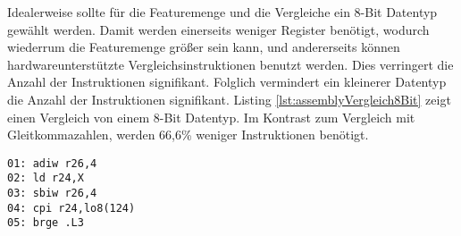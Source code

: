 Idealerweise sollte für die Featuremenge und die Vergleiche ein 8-Bit Datentyp gewählt werden. Damit werden einerseits weniger Register benötigt, wodurch wiederrum die Featuremenge größer sein kann,
und andererseits können hardwareunterstützte Vergleichsinstruktionen benutzt werden. Dies verringert die Anzahl der Instruktionen signifikant. Folglich vermindert ein kleinerer Datentyp die Anzahl der
Instruktionen signifikant. Listing \ref{lst:assemblyVergleich8Bit} zeigt einen Vergleich von einem 8-Bit Datentyp. Im Kontrast zum Vergleich mit Gleitkommazahlen, werden 66,6\% weniger Instruktionen
benötigt.
\begin{lstlisting}[label=lst:assemblyVergleich8Bit,caption={Vergleich von 8-Bit Feature mit konstanter 8-Bit Zahl.}]
01: adiw r26,4
02: ld r24,X
03: sbiw r26,4
04: cpi r24,lo8(124)
05: brge .L3
\end{lstlisting}